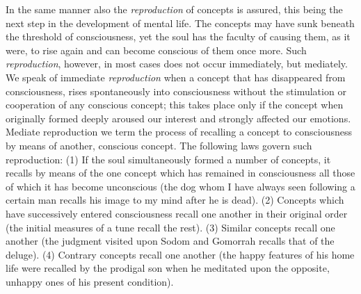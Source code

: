 In the same manner also the \emph{reproduction} of concepts is assured, this being the next step in the development of mental life. The concepts may have sunk beneath the threshold of consciousness, yet the soul has the faculty of causing them, as it were, to rise again and can become conscious of them once more. Such \emph{reproduction}, however, in most cases does not occur immediately, but mediately. We speak of immediate \emph{reproduction} when a concept that has disappeared from consciousness, rises spontaneously into consciousness without the stimulation or cooperation of any conscious
 concept; this takes place only if the concept when originally formed deeply aroused our interest and strongly affected our emotions. Mediate reproduction we term the process of recalling a concept to consciousness by means of another, conscious concept. The following laws govern such reproduction: (1) If the soul simultaneously formed a number of concepts, it recalls by means of the one concept which has remained in consciousness all those of which it has become unconscious (the dog whom I have always seen following a certain man recalls his image to my mind after he is dead). (2) Concepts which have successively entered consciousness recall one another in their original order (the initial measures of a tune recall the rest). (3) Similar concepts recall one another (the judgment visited upon Sodom and Gomorrah recalls that of the deluge). (4) Contrary concepts recall one another (the happy features of his home life were recalled by the prodigal son when he meditated upon the opposite, unhappy ones of his present condition).

